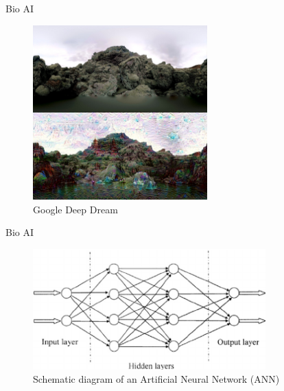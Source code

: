 \begin{frame}{Bio AI}
\begin{figure}
  \includegraphics[width=0.6\textwidth]{img/before_after_deepdream}
\captionsetup{singlelinecheck=off,justification=raggedright}
\caption{Google Deep Dream \cite{Mordvintsev2015DeepDreamNetworks}}
\end{figure}
\end{frame}


\begin{frame}{Bio AI}
\begin{figure}
  \includegraphics[width=0.8\textwidth]{img/neural_network_schematic}
  \captionsetup{singlelinecheck=off,justification=raggedright}
  \caption{Schematic diagram of an Artificial Neural Network (ANN) \cite[Figure 1]{Ata2015ArtificialReview}}
\end{figure}
\end{frame}


